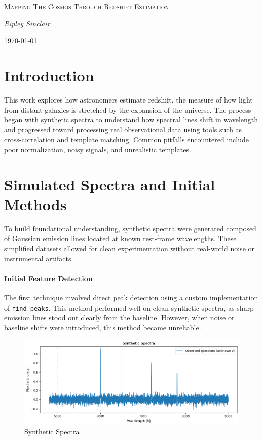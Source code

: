 \documentclass[12pt]{article}
\begin{document}
\begin{titlepage}
    \centering
    {\scshape\LARGE Mapping The Cosmos Through Redshift Estimation \par}
    \vspace{1.5cm}
    {\Large\itshape Ripley Sinclair\par}
    \vfill
    {\large \today\par}
\end{titlepage}


\section{Introduction}

This work explores how astronomers estimate redshift, the measure of how light from distant galaxies is stretched by the expansion of the universe. The process began with synthetic spectra to understand how spectral lines shift in wavelength and progressed toward processing real observational data using tools such as cross-correlation and template matching. Common pitfalls encountered include poor normalization, noisy signals, and unrealistic templates.

\section{Simulated Spectra and Initial Methods}

To build foundational understanding, synthetic spectra were generated composed of Gaussian emission lines located at known rest-frame wavelengths. These simplified datasets allowed for clean experimentation without real-world noise or instrumental artifacts.


\paragraph{Initial Feature Detection}
The first technique involved direct peak detection using a custom implementation of \texttt{find\_peaks}. This method performed well on clean synthetic spectra, as sharp emission lines stood out clearly from the baseline. However, when noise or baseline shifts were introduced, this method became unreliable.

\begin{figure}[H]
    \centering
    \includegraphics[width=1\linewidth]{image.png}
    \caption{Synthetic Spectra}
    \label{fig:placeholder}
\end{figure}
\end{document}
